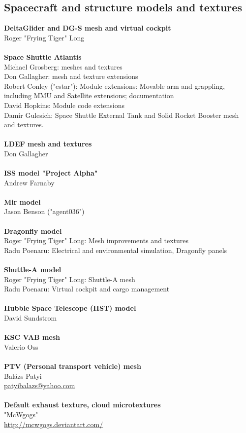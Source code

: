 \documentclass[Orbiter User Manual.tex]{subfiles}
\begin{document}
\subsection{Spacecraft and structure models and textures}
\textbf{DeltaGlider and DG-S mesh and virtual cockpit}\\
Roger "Frying Tiger" Long\\
\\
\textbf{Space Shuttle Atlantis}\\
Michael Grosberg: meshes and textures\\
Don Gallagher: mesh and texture extensions\\
Robert Conley ("estar"): Module extensions: Movable arm and grappling, including MMU and Satellite extensions; documentation\\
David Hopkins: Module code extensions\\
Damir Gulesich: Space Shuttle External Tank and Solid Rocket Booster mesh and textures.\\
\\
\textbf{LDEF mesh and textures}\\
Don Gallagher\\
\\
\textbf{ISS model "Project Alpha"}\\
Andrew Farnaby\\
\\
\textbf{Mir model}\\
Jason Benson ("agent036")\\
\\
\textbf{Dragonfly model}\\
Roger "Frying Tiger" Long: Mesh improvements and textures\\
Radu Poenaru: Electrical and environmental simulation, Dragonfly panels\\
\\
\textbf{Shuttle-A model}\\
Roger "Frying Tiger" Long: Shuttle-A mesh\\
Radu Poenaru: Virtual cockpit and cargo management\\
\\
\textbf{Hubble Space Telescope (HST) model}\\
David Sundstrom\\
\\
\textbf{KSC VAB mesh}\\
Valerio Oss\\
\\
\textbf{PTV (Personal transport vehicle) mesh}\\
Balázs Patyi\\
\href{mailto:patyibalazs@yahoo.com}{patyibalazs@yahoo.com}\\
\\
\textbf{Default exhaust texture, cloud microtextures}\\
"McWgogs"\\
\url{http://mcwgogs.deviantart.com/}
\end{document}
